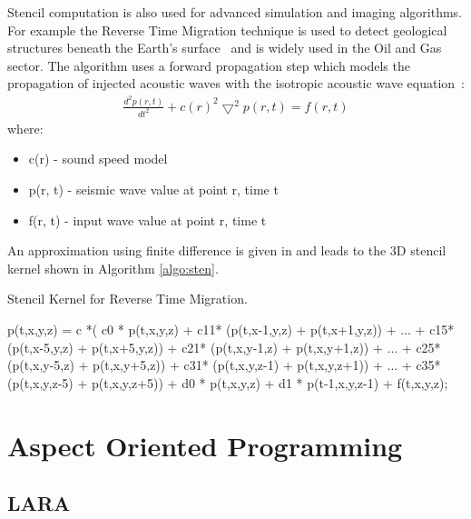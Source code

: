 Stencil computation is also used for advanced simulation and imaging
algorithms. For example the Reverse Time Migration technique is used
to detect geological structures beneath the Earth's
surface~\cite{baysal1983reverse} and is widely used in the Oil and Gas
sector. The algorithm uses a forward propagation step which models the
propagation of injected acoustic waves with the isotropic acoustic
wave equation~\cite{araya2011assessing}:
\begin{align}
  \frac{d^2p(r,t)}{dt^2} + {c(r)}^2\bigtriangledown^2p(r,t) = f(r,t)
\end{align}
where:
\begin{itemize}
\item c(r)    - sound speed model
\item p(r, t) - seismic wave value at point r, time t
\item f(r, t) - input wave value at point r, time t
\end{itemize}

An approximation using finite difference is given in
\cite{xinyu2013selfaware} and leads to the 3D stencil kernel
\cite{Xinyu:Qiwei:Luk:Qiang:Pell:2012} shown in Algorithm
\ref{algo:sten}.
\begin{algorithm}[!ht]\footnotesize
  \caption{Stencil Kernel for Reverse Time Migration.}
  \label{algo:sten}
  \begin{algorithmic}
    \State p(t,x,y,z) = c *(
    \State c0 * p(t,x,y,z) +
    \State c11* (p(t,x-1,y,z) + p(t,x+1,y,z)) + ... + c15*(p(t,x-5,y,z) + p(t,x+5,y,z)) +
    \State c21* (p(t,x,y-1,z) + p(t,x,y+1,z)) + ... + c25*(p(t,x,y-5,z) + p(t,x,y+5,z)) +
    \State c31* (p(t,x,y,z-1) + p(t,x,y,z+1)) + ... + c35*(p(t,x,y,z-5) + p(t,x,y,z+5)) +
    \State d0 *  p(t,x,y,z) + d1 * p(t-1,x,y,z-1) + f(t,x,y,z);
    \EndFor
    \EndFor
    \EndFor
    \EndFor
  \end{algorithmic}
\end{algorithm}


\section{Aspect Oriented Programming}

\subsection{LARA}

